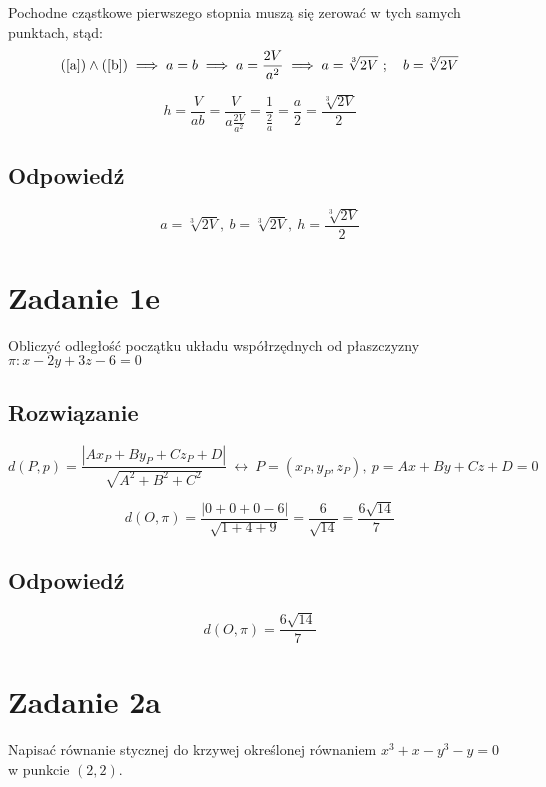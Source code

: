 \documentclass{article}
\newcommand{\for}{\ \leftrightarrow\ }
\DeclareMathOperator{\?}{?}
\begin{document}
Pochodne cząstkowe pierwszego stopnia muszą się zerować w tych samych punktach, stąd:
\begin{equation*}
   (\ref{a}) \land (\ref{b}) \implies a = b \implies a = \frac{2V}{a^2} \implies a = \sqrt[3]{2V}\ ;\quad b = \sqrt[3]{2V}
\end{equation*}

\begin{equation*}
   h = \frac{V}{ab} = \frac{V}{a\frac{2V}{a^2}} = \frac{1}{\frac{2}{a}} = \frac{a}{2} = \frac{\sqrt[3]{2V}}{2}
\end{equation*}

\subsection*{Odpowiedź}

\begin{equation*}
   a = \sqrt[3]{2V}, \ b = \sqrt[3]{2V}, \ h = \frac{\sqrt[3]{2V}}{2}
\end{equation*}

\section*{Zadanie 1e}
Obliczyć odległość początku układu współrzędnych od płaszczyzny $\pi: x - 2y + 3z - 6 = 0$
\subsection*{Rozwiązanie}

\begin{equation*}
   d(P,p) = \frac{ | Ax_P + By_P + Cz_P + D | }{ \sqrt{A^2 + B^2 + C^2 }} \for P = (x_P,y_P,z_P), \ p = Ax + By + Cz + D = 0
\end{equation*}

\begin{equation*}
   d(O,\pi) = \frac{ |0 + 0 + 0 - 6| }{\sqrt{1 + 4 + 9}} = \frac{6}{\sqrt{14}} = \frac{6\sqrt{14}}{7}
\end{equation*}

\subsection*{Odpowiedź}
\begin{equation*}
   d(O,\pi) = \frac{6\sqrt{14}}{7}
\end{equation*}

\clearpage

\section*{Zadanie 2a}
Napisać równanie stycznej do krzywej określonej równaniem $x^3 + x - y^3 - y = 0$
w punkcie $(2,2)$.
\end{document}
